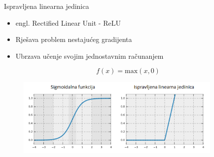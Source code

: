 \documentclass[pdf]{beamer}
\begin{document}
\begin{frame}{Ispravljena linearna jedinica}

\begin{itemize}
\setlength\itemsep{0.5em}

	\item engl. Rectified Linear Unit - ReLU
 
	\item  Rješava problem nestajućeg gradijenta
	
	\item Ubrzava učenje svojim jednostavnim računanjem
\end{itemize} 

\begin{equation}
f(x) = \text{max}(x, 0) \nonumber     
\end{equation}

\begin{figure}
\centering
\includegraphics[width=10cm]{slike/sigmoid_relu.png}
\end{figure}

\end{frame}
\end{document}
